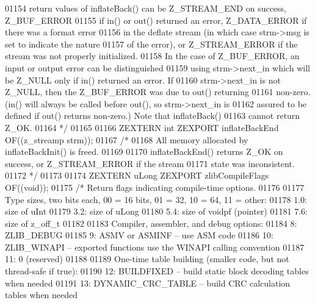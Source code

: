 \begin{DoxyCode}
01154 \textcolor{comment}{   return values of inflateBack() can be Z\_STREAM\_END on success, Z\_BUF\_ERROR}
01155 \textcolor{comment}{   if in() or out() returned an error, Z\_DATA\_ERROR if there was a format error}
01156 \textcolor{comment}{   in the deflate stream (in which case strm->msg is set to indicate the nature}
01157 \textcolor{comment}{   of the error), or Z\_STREAM\_ERROR if the stream was not properly initialized.}
01158 \textcolor{comment}{   In the case of Z\_BUF\_ERROR, an input or output error can be distinguished}
01159 \textcolor{comment}{   using strm->next\_in which will be Z\_NULL only if in() returned an error.  If}
01160 \textcolor{comment}{   strm->next\_in is not Z\_NULL, then the Z\_BUF\_ERROR was due to out() returning}
01161 \textcolor{comment}{   non-zero.  (in() will always be called before out(), so strm->next\_in is}
01162 \textcolor{comment}{   assured to be defined if out() returns non-zero.)  Note that inflateBack()}
01163 \textcolor{comment}{   cannot return Z\_OK.}
01164 \textcolor{comment}{*/}
01165 
01166 ZEXTERN \textcolor{keywordtype}{int} ZEXPORT inflateBackEnd OF((z\_streamp strm));
01167 \textcolor{comment}{/*}
01168 \textcolor{comment}{     All memory allocated by inflateBackInit() is freed.}
01169 \textcolor{comment}{}
01170 \textcolor{comment}{     inflateBackEnd() returns Z\_OK on success, or Z\_STREAM\_ERROR if the stream}
01171 \textcolor{comment}{   state was inconsistent.}
01172 \textcolor{comment}{*/}
01173 
01174 ZEXTERN uLong ZEXPORT zlibCompileFlags OF((\textcolor{keywordtype}{void}));
01175 \textcolor{comment}{/* Return flags indicating compile-time options.}
01176 \textcolor{comment}{}
01177 \textcolor{comment}{    Type sizes, two bits each, 00 = 16 bits, 01 = 32, 10 = 64, 11 = other:}
01178 \textcolor{comment}{     1.0: size of uInt}
01179 \textcolor{comment}{     3.2: size of uLong}
01180 \textcolor{comment}{     5.4: size of voidpf (pointer)}
01181 \textcolor{comment}{     7.6: size of z\_off\_t}
01182 \textcolor{comment}{}
01183 \textcolor{comment}{    Compiler, assembler, and debug options:}
01184 \textcolor{comment}{     8: ZLIB\_DEBUG}
01185 \textcolor{comment}{     9: ASMV or ASMINF -- use ASM code}
01186 \textcolor{comment}{     10: ZLIB\_WINAPI -- exported functions use the WINAPI calling convention}
01187 \textcolor{comment}{     11: 0 (reserved)}
01188 \textcolor{comment}{}
01189 \textcolor{comment}{    One-time table building (smaller code, but not thread-safe if true):}
01190 \textcolor{comment}{     12: BUILDFIXED -- build static block decoding tables when needed}
01191 \textcolor{comment}{     13: DYNAMIC\_CRC\_TABLE -- build CRC calculation tables when needed}

\end{DoxyCode}
